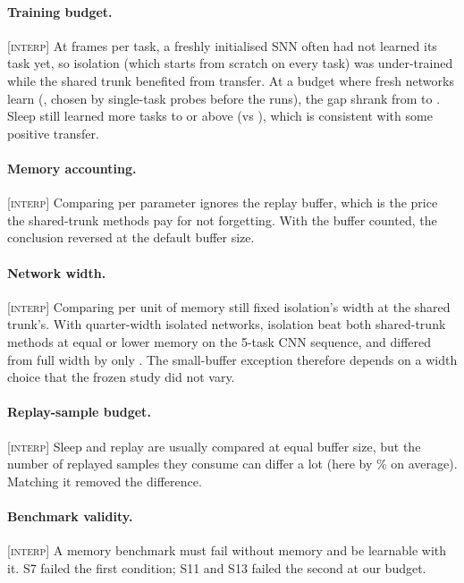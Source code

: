 \documentclass[10pt]{article}
\newcommand{\interp}{\textsc{[interp]}\xspace}
\begin{document}
\paragraph{Training budget.} \interp At \framesPerTaskFlat frames per task, a freshly initialised SNN often had not
learned its task yet, so isolation (which starts from scratch on every task) was under-trained while the shared trunk
benefited from transfer. At a budget where fresh networks learn (\framesPerTaskFiveFair, chosen by single-task probes
before the runs), the gap shrank from \fiveSnnShortCi to \fiveSnnFairCi. Sleep still learned more tasks to
\learnThreshold or above (\fiveSnnFairLearnedSleep vs \fiveSnnFairLearnedIso), which is consistent with some positive
transfer.

\paragraph{Memory accounting.} \interp Comparing per parameter ignores the replay buffer, which is the price the
shared-trunk methods pay for not forgetting. With the buffer counted, the conclusion reversed at the default buffer
size.

\paragraph{Network width.} \interp Comparing per unit of memory still fixed isolation's width at the shared trunk's.
With quarter-width isolated networks, isolation beat both shared-trunk methods at equal or lower memory on the 5-task
CNN sequence, and differed from full width by only \postHTenCi. The small-buffer exception therefore depends on a width choice
that the frozen study did not vary.

\paragraph{Replay-sample budget.} \interp Sleep and replay are usually compared at equal buffer size, but the number of
replayed samples they consume can differ a lot (here by \unmatchedExtraPct\% on average). Matching it removed the
difference.

\paragraph{Benchmark validity.} \interp A memory benchmark must fail without memory and be learnable with it. S7 failed
the first condition; S11 and S13 failed the second at our budget.
\end{document}
